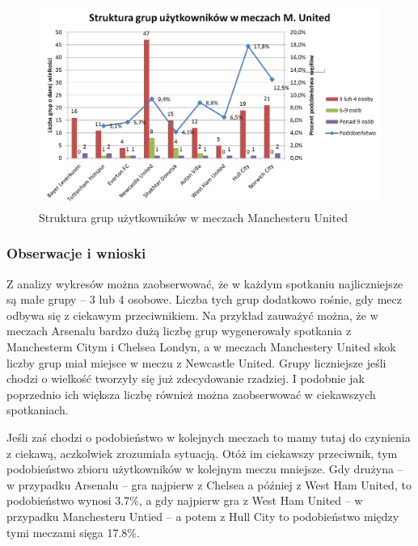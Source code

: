 \begin{figure}[ht!]
\centering
\includegraphics[width=160mm]{img/grupy-munited-nums.png}
\caption{Struktura grup użytkowników w meczach Manchesteru United}
\label{image:grupy-munited}
\end{figure}


\clearpage
\subsubsection{Obserwacje i wnioski}
Z analizy wykresów można zaobserwować, że w każdym spotkaniu najliczniejsze
są małe grupy -- 3 lub 4 osobowe. Liczba tych grup dodatkowo rośnie, gdy
mecz odbywa się z ciekawym przeciwnikiem. Na przykład zauważyć można, że
w meczach Arsenalu bardzo dużą liczbę grup wygenerowały spotkania
z Manchesterm Citym i Chelsea Londyn, a w meczach Manchestery United
skok liczby grup miał miejsce w meczu z Newcastle United.
Grupy liczniejsze jeśli chodzi o wielkość tworzyły się już zdecydowanie rzadziej.
I podobnie jak poprzednio ich większa liczbę również można zaobserwować
w ciekawszych spotkaniach.

Jeśli zaś chodzi o podobieństwo w kolejnych meczach to mamy tutaj do czynienia
z ciekawą, aczkolwiek zrozumiała sytuacją. Otóż im ciekawszy przeciwnik,
tym podobieństwo zbioru użytkowników w kolejnym meczu mniejsze.
Gdy drużyna -- w przypadku Arsenalu --  gra najpierw z Chelsea a później z 
West Ham United, to podobieństwo wynosi 3.7\%, a gdy najpierw gra z 
West Ham United -- w przypadku Manchesteru Untied -- a potem z Hull City
to podobieństwo między tymi meczami sięga 17.8\%.

